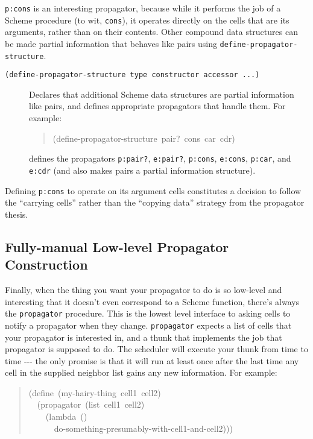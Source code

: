 \documentclass[12pt,letterpaper,english]{article}
\begin{document}
\texttt{p:cons} is an interesting propagator, because while it performs the
job of a Scheme procedure (to wit, \texttt{cons}), it operates directly on
the cells that are its arguments, rather than on their contents.
Other compound data structures can be made partial information that
behaves like pairs using \texttt{define-propagator-structure}.
\begin{description}
\item[{\texttt{(define-propagator-structure type constructor accessor ...)}}] \leavevmode 
Declares that additional Scheme data structures are partial
information like pairs, and defines appropriate propagators
that handle them.  For example:
\begin{quote}{\ttfamily \raggedright \noindent
(define-propagator-structure~pair?~cons~car~cdr)
}\end{quote}
defines the propagators \texttt{p:pair?}, \texttt{e:pair?}, \texttt{p:cons},
\texttt{e:cons}, \texttt{p:car}, and \texttt{e:cdr} (and also makes pairs
a partial information structure).

\end{description}

Defining \texttt{p:cons} to operate on its argument cells constitutes a
decision to follow the ``carrying cells'' rather than the ``copying data''
strategy from the propagator thesis.



\subsection{Fully-manual Low-level Propagator Construction}
\label{fully-manual-low-level-propagator-construction}

Finally, when the thing you want your propagator to do is so low-level and
interesting that it doesn't even correspond to a Scheme function,
there's always the \texttt{propagator} procedure.  This is the lowest level
interface to asking cells to notify a propagator when they change.
\texttt{propagator} expects a list of cells that your propagator is
interested in, and a thunk that implements the job that propagator is
supposed to do.  The scheduler will execute your thunk from time to
time -{}-{}- the only promise is that it will run at least once after the
last time any cell in the supplied neighbor list gains any new
information.  For example:
\begin{quote}{\ttfamily \raggedright \noindent
(define~(my-hairy-thing~cell1~cell2)~\\
~~(propagator~(list~cell1~cell2)~\\
~~~~(lambda~()~\\
~~~~~~do-something-presumably-with-cell1-and-cell2)))
}\end{quote}
\end{document}
